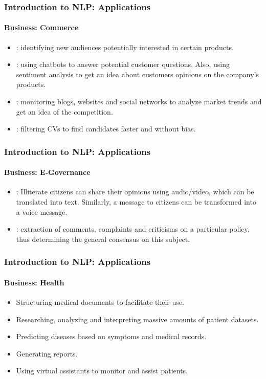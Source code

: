 \documentclass[xcolor=table]{beamer}
\begin{document}
\begin{frame}
\frametitle{Introduction to NLP: Applications}
\framesubtitle{Business: Commerce}

\begin{itemize}
	\item {}: identifying new audiences potentially interested in certain products.
	\item {}: using chatbots to answer potential customer questions.
	Also, using sentiment analysis to get an idea about customers opinions on the company's products.
	\item {}: monitoring blogs, websites and social networks to analyze market trends and get an idea of the competition.
	\item {}: filtering CVs to find candidates faster and without bias.
\end{itemize}

\end{frame}

\begin{frame}
\frametitle{Introduction to NLP: Applications}
\framesubtitle{Business: E-Governance}

\begin{itemize}
	\item {}: Illiterate citizens can share their opinions using audio/video, which can be translated into text. Similarly, a message to citizens can be transformed into a voice message.
	\item {}: extraction of comments, complaints and criticisms on a particular policy, thus determining the general consensus on this subject.
\end{itemize}

\end{frame}

\begin{frame}
\frametitle{Introduction to NLP: Applications}
\framesubtitle{Business: Health}

\begin{itemize}
	\item Structuring medical documents to facilitate their use.
	\item Researching, analyzing and interpreting massive amounts of patient datasets.
	\item Predicting diseases based on symptoms and medical records.
	\item Generating reports.
	\item Using virtual assistants to monitor and assist patients.
\end{itemize}

\end{frame}
\end{document}
